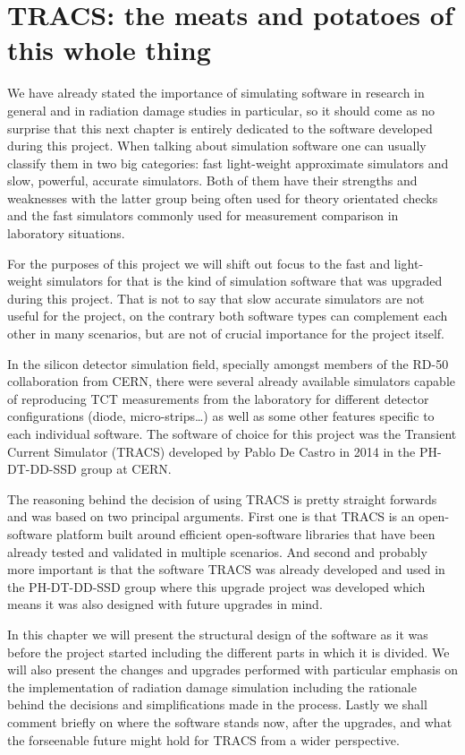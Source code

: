 \chapter{TRACS: the meats and potatoes of this whole thing}
\label{chap:Comp}

We have already stated the importance of simulating software in research in general and in radiation damage studies in particular, so it should come as no surprise that this next chapter is entirely dedicated to the software developed during this project. When talking about simulation software one can usually classify them in two big categories: fast light-weight approximate simulators and slow, powerful, accurate simulators. Both of them have their strengths and weaknesses with the latter group being often used for theory orientated checks and the fast simulators commonly used for measurement comparison in laboratory situations.

For the purposes of this project we will shift out focus to the fast and light-weight simulators for that is the kind of simulation software that was upgraded during this project. That is not to say that slow accurate simulators are not useful for the project, on the contrary both software types can complement each other in many scenarios, but are not of crucial importance for the project itself.

In the silicon detector simulation field, specially amongst members of the RD-50 collaboration from CERN, there were several already available simulators capable of reproducing TCT measurements from the laboratory for different detector configurations (diode, micro-strips\ldots) as well as some other features specific to each individual software. The software of choice for this project was the Transient Current Simulator (TRACS) developed by Pablo De Castro in 2014 in the PH-DT-DD-SSD group at CERN. 

The reasoning behind the decision of using TRACS is pretty straight forwards and was based on two principal arguments. First one is that TRACS is an open-software platform built around efficient open-software libraries that have been already tested and validated in multiple scenarios. And second and probably more important is that the software TRACS was already developed and used in the PH-DT-DD-SSD group where this upgrade project was developed which means it was also designed with future upgrades in mind. 

In this chapter we will present the structural design of the software as it was before the project started including the different parts in which it is divided. We will also present the changes and upgrades performed with particular emphasis on the implementation of radiation damage simulation including the rationale behind the decisions and simplifications made in the process. Lastly we shall comment briefly on where the software stands now, after the upgrades, and what the forseenable future might hold for TRACS from a wider perspective.

